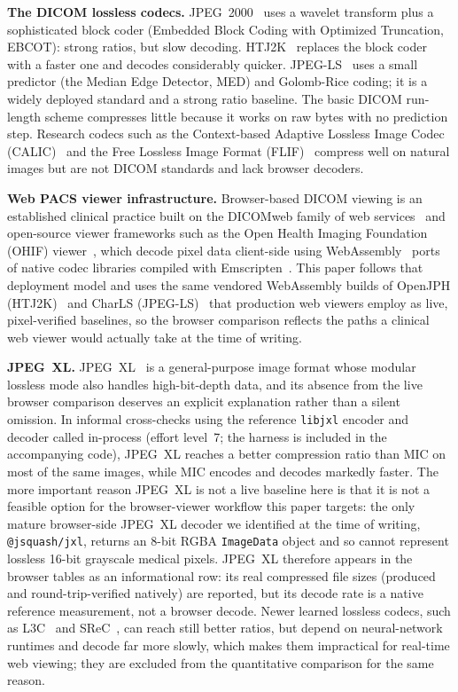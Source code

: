 \documentclass[journal]{IEEEtran}
\begin{document}
\textbf{The DICOM lossless codecs.} JPEG~2000~\cite{taubman2002} uses a
wavelet transform plus a sophisticated block coder (Embedded Block Coding with
Optimized Truncation, EBCOT): strong ratios, but slow decoding.
HTJ2K~\cite{htj2k2019,taubman2022} replaces the block coder with a faster one
and decodes considerably quicker. JPEG-LS~\cite{loco1} uses a small predictor
(the Median Edge Detector, MED) and Golomb-Rice coding; it is a widely
deployed standard and a strong ratio baseline. The basic DICOM run-length
scheme compresses little because it works on raw bytes with no prediction
step. Research codecs such as the Context-based Adaptive Lossless Image Codec
(CALIC)~\cite{wu1997} and the Free Lossless Image Format
(FLIF)~\cite{sneyers2016} compress well on natural images but are not DICOM
standards and lack browser decoders.

\textbf{Web PACS viewer infrastructure.} Browser-based DICOM viewing is an
established clinical practice built on the DICOMweb family of web
services~\cite{genereaux2018} and open-source viewer frameworks such as the
Open Health Imaging Foundation (OHIF) viewer~\cite{ziegler2020}, which decode
pixel data client-side using WebAssembly~\cite{haas2017} ports of native codec
libraries compiled with Emscripten~\cite{zakai2011}. This paper follows that
deployment model and uses the same vendored WebAssembly builds of OpenJPH
(HTJ2K)~\cite{openjph} and CharLS (JPEG-LS)~\cite{charls} that production web
viewers employ as live, pixel-verified baselines, so the browser comparison
reflects the paths a clinical web viewer would actually take at the time of
writing.

\textbf{JPEG~XL.} JPEG~XL~\cite{jpegxl} is a general-purpose image format
whose modular lossless mode also handles high-bit-depth data, and its absence
from the live browser comparison deserves an explicit explanation rather than
a silent omission. In informal cross-checks using the reference
\texttt{libjxl} encoder and decoder called in-process (effort level~7; the
harness is included in the accompanying code), JPEG~XL reaches a better
compression ratio than MIC on most of the same images, while MIC encodes and
decodes markedly faster. The more important reason JPEG~XL is not a live
baseline here is that it is not a feasible option for the browser-viewer
workflow this paper targets: the only mature browser-side JPEG~XL decoder we
identified at the time of writing, \texttt{@jsquash/jxl}, returns an 8-bit
RGBA \texttt{ImageData} object and so cannot represent lossless 16-bit
grayscale medical pixels. JPEG~XL therefore appears in the browser tables as
an informational row: its real compressed file sizes (produced and
round-trip-verified natively) are reported, but its decode rate is a native
reference measurement, not a browser decode. Newer learned lossless codecs,
such as L3C~\cite{mentzer2019l3c} and SReC~\cite{cao2020srec}, can reach still
better ratios, but depend on neural-network runtimes and decode far more
slowly, which makes them impractical for real-time web viewing; they are
excluded from the quantitative comparison for the same reason.
\end{document}
